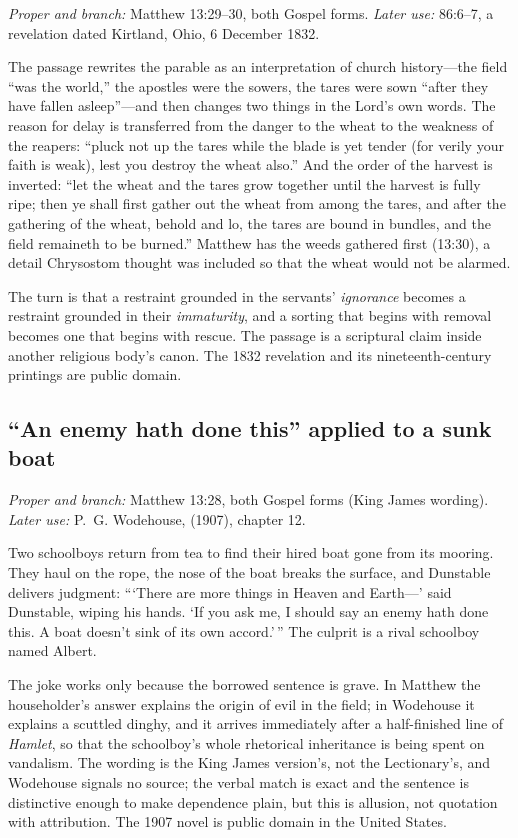 \emph{Proper and branch:} Matthew 13:29--30, both Gospel forms.
\emph{Later use:}  86:6--7, a revelation dated
Kirtland, Ohio, 6 December 1832.

The passage rewrites the parable as an interpretation of church history---the
field ``was the world,'' the apostles were the sowers, the tares were sown
``after they have fallen asleep''---and then changes two things in the Lord's own
words. The reason for delay is transferred from the danger to the wheat to the
weakness of the reapers: ``pluck not up the tares while the blade is yet tender
(for verily your faith is weak), lest you destroy the wheat also.'' And the
order of the harvest is inverted: ``let the wheat and the tares grow together
until the harvest is fully ripe; then ye shall first gather out the wheat from
among the tares, and after the gathering of the wheat, behold and lo, the tares
are bound in bundles, and the field remaineth to be burned.'' Matthew has the
weeds gathered first (13:30), a detail Chrysostom thought was included so that
the wheat would not be alarmed.

The turn is that a restraint grounded in the servants' \emph{ignorance} becomes
a restraint grounded in their \emph{immaturity}, and a sorting that begins with
removal becomes one that begins with rescue. The passage is a scriptural
claim inside another religious body's canon. The 1832 revelation and its
nineteenth-century printings are public domain.

\subsection*{``An enemy hath done this'' applied to a sunk boat}

\emph{Proper and branch:} Matthew 13:28, both Gospel forms (King James
wording).
\emph{Later use:} P.~G. Wodehouse,  (1907), chapter 12.

Two schoolboys return from tea to find their hired boat gone from its mooring.
They haul on the rope, the nose of the boat breaks the surface, and Dunstable
delivers judgment: ```There are more things in Heaven and Earth---' said
Dunstable, wiping his hands. `If you ask me, I should say an enemy hath done
this. A boat doesn't sink of its own accord.'\,'' The culprit is a rival
schoolboy named Albert.

The joke works only because the borrowed sentence is grave. In Matthew the
householder's answer explains the origin of evil in the field; in Wodehouse it
explains a scuttled dinghy, and it arrives immediately after a half-finished
line of \emph{Hamlet}, so that the schoolboy's whole rhetorical inheritance is
being spent on vandalism. The wording is the King James version's, not the
Lectionary's, and Wodehouse signals no source; the verbal match is exact and
the sentence is distinctive enough to make dependence plain, but this is
allusion, not quotation with attribution. The 1907 novel is public domain in
the United States.

